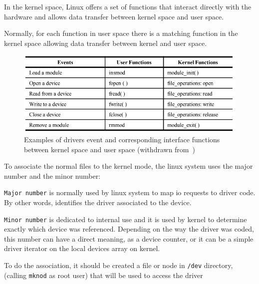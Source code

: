 In the kernel space, Linux offers a set of functions that interact directly with the hardware and allows data transfer between kernel space and user space.

Normally, for each function in user space there is a matching function in the kernel space allowing data transfer between kernel and user space.

\begin{figure}[htb!]
\centering
    \includegraphics[width=0.75\columnwidth]{./img/ddrivers-events-ex.png}
  \caption{Examples of drivers event and corresponding interface functions between kernel space and user space (withdrawn from~\cite{ddrivers-slides})}%
\label{fig:ddrivers-events-ex}
\end{figure}

To associate the normal files to the kernel mode, the linux
system uses the major number and the minor number:

\texttt{Major number} is normally used by linux system to map \gls{io} requests to driver code. 
By other words, identifies the driver associated to the device.


\texttt{Minor number} is dedicated to internal use and it is used by kernel to determine exactly which device was referenced. 
Depending on the way the driver was coded,
this number can have a direct meaning, as a device counter, or it can be a simple driver iterator on the local devices array on kernel.

To do the association, it should be created a file or node in \texttt{/dev} directory, (calling \texttt{mknod} as root user) that will be used to access the driver

